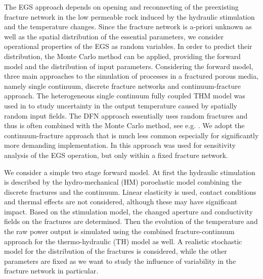 \documentclass{article}
\begin{document}
The EGS approach depends on opening and reconnecting of the preexisting fracture network in the low permeable rock induced by
the hydraulic stimulation and the temperature changes. Since the fracture network is a-priori unknown as well as the spatial
distribution of the essential parameters, we consider operational properties of the EGS as random variables. In order to predict their
distribution, the Monte Carlo method can be applied, providing the forward model and the distribution of input parameters.
Considering the forward model, three main approaches to the simulation of processes in a fractured porous media, namely single
continuum, discrete fracture networks and continuum-fracture approach. The heterogeneous single continuum fully coupled THM
model was used in \cite{Watanabe2009} to study uncertainty in the output temperature caused by spatially random input fields.
The DFN approach essentially uses random fractures and thus is often combined with the Monte Carlo method, see e.g. \cite{ezzedine2008}. We adopt the continuum-fracture approach that is much less common especially for significantly more demanding
implementation. In \cite{Doonechaly2016} this approach was used for sensitivity analysis of the EGS operation, but
only within a fixed fracture network.

We consider a simple two stage forward model. At first the hydraulic stimulation is described by the hydro-mechanical (HM)
poroelastic model combining the discrete fractures and the continuum. Linear elasticity is used, contact conditions and thermal effects
are not considered, although these may have significant impact. Based on the stimulation model, the changed aperture and
conductivity fields on the fractures are determined. Then the evolution of the temperature and the raw power output is simulated
using the combined fracture-continuum approach for the thermo-hydraulic (TH) model as well. A realistic stochastic model for the
distribution of the fractures is considered, while the other parameters are fixed as we want to study the influence of variability in the
fracture network in particular.
\end{document}
